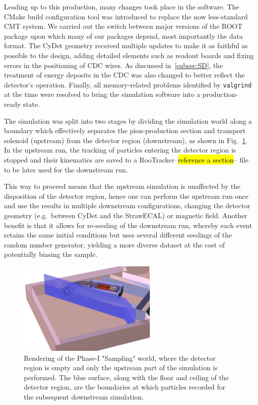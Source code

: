 Leading up to this production, many changes took place in the software. The CMake build configuration tool was introduced to replace the now less-standard CMT system. We carried out the switch between major versions of the ROOT package upon which many of our packages depend, most importantly the \oaEvent data format. The CyDet geometry received multiple updates to make it as faithful as possible to the design, adding detailed elements such as readout boards and fixing errors in the positioning of CDC wires. As discussed in~\ref{subsec:SD}, the treatment of energy deposits in the CDC was also changed to better reflect the detector's operation.  %
Finally, all memory-related problems identified by \texttt{valgrind} at the time were resolved to bring the simulation software into a production-ready state.

The simulation was split into two stages by dividing the simulation world along a boundary which effectively separates the pion-production section and transport solenoid (upstream) from the detector region (downstream), as shown in Fig.~\ref{fig:Phase-I Sampling World}. In the upstream run, the tracking of particles entering the detector region is stopped and their kinematics are saved to a RooTracker--\hl{reference a section}-- file to be later used for the downstream run. 

This way to proceed means that the upstream simulation is unaffected by the disposition of the detector region, hence one can perform the upstream run once and use the results in multiple downstream configurations, changing the detector geometry (e.g.\ between CyDet and the StrawECAL) or magnetic field. 
Another benefit is that it allows for re-seeding of the downstream run, whereby each event retains the same initial conditions but uses several different seedings of the random number generator, yielding a more diverse dataset at the cost of potentially biasing the sample.

\begin{figure}
    \centering
    \includegraphics[width=0.6\textwidth]{chapter3/sampling_world_crop_smooth_transparency.png}
    \caption{Rendering of the Phase-I "Sampling" world, where the detector region is empty and only the upstream part of the simulation is performed. The blue surface, along with the floor and ceiling of the detector region, are the boundaries at which particles recorded for the subsequent downstream simulation.}
    \label{fig:Phase-I Sampling World}
\end{figure}

